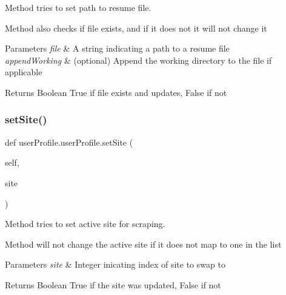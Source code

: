 Method tries to set path to resume file. 

Method also checks if file exists, and if it does not it will not change it 
\begin{DoxyParams}{Parameters}
{\em file} & A string indicating a path to a resume file \\
\hline
{\em append\+Working} & (optional) Append the working directory to the file if applicable \\
\hline
\end{DoxyParams}
\begin{DoxyReturn}{Returns}
Boolean True if file exists and updates, False if not 
\end{DoxyReturn}
\mbox{\label{classuserProfile_1_1userProfile_a67fc7d06910ee0cb4914884dff2ef28e}} 
\subsubsection{\texorpdfstring{set\+Site()}{setSite()}}
{\footnotesize\ttfamily def user\+Profile.\+user\+Profile.\+set\+Site (\begin{DoxyParamCaption}\item[{}]{self,  }\item[{}]{site }\end{DoxyParamCaption})}



Method tries to set active site for scraping. 

Method will not change the active site if it does not map to one in the list 
\begin{DoxyParams}{Parameters}
{\em site} & Integer inicating index of site to swap to \\
\hline
\end{DoxyParams}
\begin{DoxyReturn}{Returns}
Boolean True if the site was updated, False if not 
\end{DoxyReturn}
\mbox{\label{classuserProfile_1_1userProfile_a2a10347741d3e396e48d6aa1bb49cecb}} 
